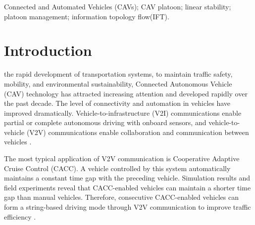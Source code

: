\documentclass[journal]{IEEEtran}
\begin{document}
\begin{IEEEkeywords}
Connected and Automated Vehicles (CAVs); CAV platoon; linear stability; platoon management; information topology flow(IFT).
\end{IEEEkeywords}






%
\IEEEpeerreviewmaketitle



\section{Introduction}
\label{Section 1}
% 
% 
% 
% 
 the rapid development of transportation systems, to maintain traffic safety, mobility, and environmental sustainability, Connected Autonomous Vehicle (CAV) technology has attracted increasing attention and developed rapidly over the past decade. The level of connectivity and automation in vehicles have improved dramatically. Vehicle-to-infrastructure (V2I) communications enable partial or complete autonomous driving with onboard sensors, and vehicle-to-vehicle (V2V) communications enable collaboration and communication between vehicles \citep{wang2019survey}.


The most typical application of V2V communication is Cooperative Adaptive Cruise Control (CACC). A vehicle controlled by this system automatically maintains a constant time gap with the preceding vehicle. Simulation results and field experiments reveal that CACC-enabled vehicles can maintain a shorter time gap than manual vehicles. Therefore, consecutive CACC-enabled vehicles can form a string-based driving mode through V2V communication to improve traffic efficiency \citep{shladover2015cooperative,wang2020controllability}.
\end{document}
